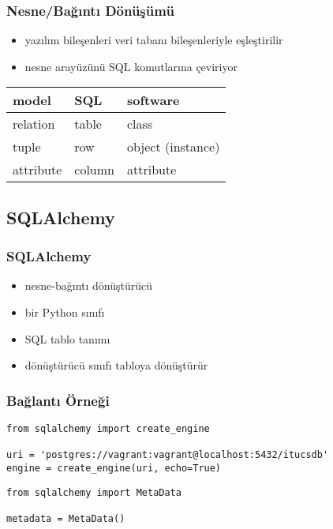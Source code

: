 \documentclass[dvipsnames]{beamer}
\theoremstyle{plain}
\begin{document}
\begin{frame}
  \frametitle{Nesne/Bağıntı Dönüşümü}

  \begin{itemize}
    \item yazılım bileşenleri veri tabanı bileşenleriyle eşleştirilir
    \item nesne arayüzünü SQL komutlarına çeviriyor
  \end{itemize}

  \begin{table}
    \begin{tabular}{|l|l|l|}\hline
model     & SQL    & software\\[2pt]\hline\hline
relation  & table  & class\\\hline
tuple     & row    & object (instance)\\\hline
attribute & column & attribute\\\hline
      \end{tabular}
    \end{table}
\end{frame}

\subsection{SQLAlchemy}

\begin{frame}
  \frametitle{SQLAlchemy}

  \begin{itemize}
    \item nesne-bağıntı dönüştürücü

    \medskip
    \item bir Python sınıfı
    \item SQL tablo tanımı
    \item dönüştürücü sınıfı tabloya dönüştürür
  \end{itemize}
\end{frame}

\begin{frame}[fragile]
  \frametitle{Bağlantı Örneği}

  \begin{lstlisting}
from sqlalchemy import create_engine

uri = 'postgres://vagrant:vagrant@localhost:5432/itucsdb'
engine = create_engine(uri, echo=True)
  \end{lstlisting}

  \pause
  \medskip
  \begin{lstlisting}
from sqlalchemy import MetaData

metadata = MetaData()
  \end{lstlisting}
\end{frame}
\end{document}
